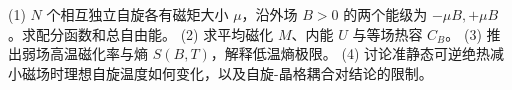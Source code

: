 (1) \(N\) 个相互独立自旋各有磁矩大小 \(\mu\)，沿外场 \(B>0\) 的两个能级为 \(-\mu B,+\mu B\)。求配分函数和总自由能。
(2) 求平均磁化 \(M\)、内能 \(U\) 与等场热容 \(C_B\)。
(3) 推出弱场高温磁化率与熵 \(S(B,T)\)，解释低温熵极限。
(4) 讨论准静态可逆绝热减小磁场时理想自旋温度如何变化，以及自旋-晶格耦合对结论的限制。
